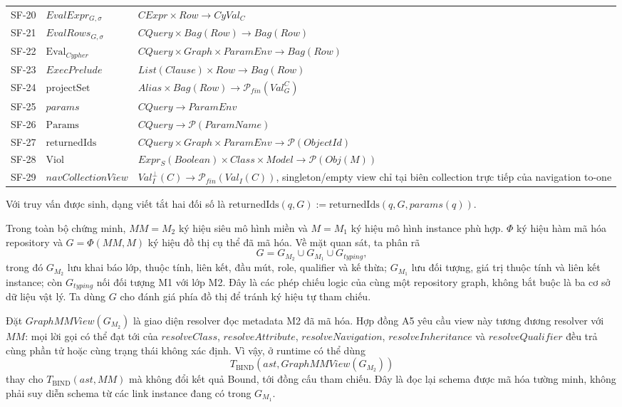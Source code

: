 \documentclass[11pt,a4paper]{article}
\theoremstyle{definition}
\newcommand{\PhiEnc}{\Phi}
\newcommand{\returnedIds}{\mathrm{returnedIds}}
\newcommand{\Viol}{\mathrm{Viol}}
\newcommand{\EvalCypher}{\mathrm{Eval}_{Cypher}}
\newcommand{\Params}{\mathrm{Params}}
\newcommand{\projectSet}{\mathrm{projectSet}}
\begin{document}
\begin{longtable}{p{1.15cm}p{3.0cm}p{8.8cm}}
SF-20 & $EvalExpr_{G,\sigma}$ & $CExpr\times Row\to CyVal_C$\\
SF-21 & $EvalRows_{G,\sigma}$ & $CQuery\times Bag(Row)\to Bag(Row)$\\
SF-22 & $\EvalCypher$ & $CQuery\times Graph\times ParamEnv\to Bag(Row)$\\
SF-23 & $ExecPrelude$ & $List(Clause)\times Row\to Bag(Row)$\\
SF-24 & $\projectSet$ & $Alias\times Bag(Row)\to\mathcal P_{fin}(Val_G^C)$\\
SF-25 & $params$ & $CQuery\to ParamEnv$\\
SF-26 & $\Params$ & $CQuery\to\mathcal P(ParamName)$\\
SF-27 & $\returnedIds$ & $CQuery\times Graph\times ParamEnv\to\mathcal P(ObjectId)$\\
SF-28 & $\Viol$ & $Expr_S(Boolean)\times Class\times Model\to\mathcal P(Obj(M))$\\
SF-29 & $navCollectionView$ & $Val_I^\bot(C)\to\mathcal P_{fin}(Val_I(C))$, singleton/empty view chỉ tại biên collection trực tiếp của navigation to-one\\
\bottomrule
\end{longtable}
\normalsize

Với truy vấn được sinh, dạng viết tắt hai đối số là
$\returnedIds(q,G):=\returnedIds(q,G,params(q))$.

Trong toàn bộ chứng minh, $MM=M_2$ ký hiệu siêu mô hình miền và $M=M_1$ ký hiệu
mô hình instance phù hợp. $\PhiEnc$ ký hiệu hàm mã hóa repository và
$G=\PhiEnc(MM,M)$ ký hiệu đồ thị cụ thể đã mã hóa. Về mặt quan sát, ta phân rã
\[
G=G_{M_2}\cup G_{M_1}\cup G_{typing},
\]
trong đó $G_{M_2}$ lưu khai báo lớp, thuộc tính, liên kết, đầu mút, role,
qualifier và kế thừa; $G_{M_1}$ lưu đối tượng, giá trị thuộc tính và liên kết
instance; còn $G_{typing}$ nối đối tượng M1 với lớp M2. Đây là các phép chiếu
logic của cùng một repository graph, không bắt buộc là ba cơ sở dữ liệu vật lý.
Ta dùng $G$ cho đánh giá phía đồ thị để tránh ký hiệu tự tham chiếu.

Đặt $GraphMMView(G_{M_2})$ là giao diện resolver đọc metadata M2 đã mã hóa.
Hợp đồng A5 yêu cầu view này tương đương resolver với $MM$: mọi lời gọi có thể
đạt tới của $resolveClass$, $resolveAttribute$, $resolveNavigation$,
$resolveInheritance$ và $resolveQualifier$ đều trả cùng phần tử hoặc cùng trạng
thái không xác định. Vì vậy, ở runtime có thể dùng
\[
T_{\mathrm{BIND}}(ast,GraphMMView(G_{M_2}))
\]
thay cho $T_{\mathrm{BIND}}(ast,MM)$ mà không đổi kết quả Bound, tới đồng cấu
tham chiếu. Đây là đọc lại schema được mã hóa tường minh, không phải suy diễn
schema từ các link instance đang có trong $G_{M_1}$.
\end{document}
